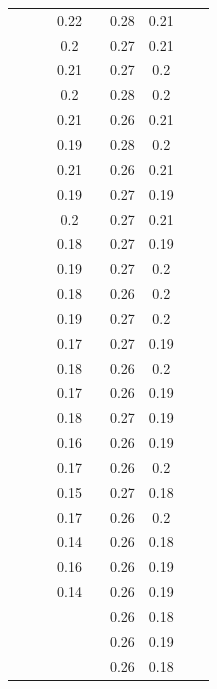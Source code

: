 \documentclass[AutoFakeBold]{LZUThesis}
\begin{document}
\begin{longtable}{ccccccccc}
      &       &       & 0.22  &       & 0.28  & 0.21 &      &       \\
      &       &       & 0.2   &       & 0.27  & 0.21 &      &       \\
      &       &       & 0.21  &       & 0.27  & 0.2  &      &       \\
      &       &       & 0.2   &       & 0.28  & 0.2  &      &       \\
      &       &       & 0.21  &       & 0.26  & 0.21 &      &       \\
      &       &       & 0.19  &       & 0.28  & 0.2  &      &       \\
      &       &       & 0.21  &       & 0.26  & 0.21 &      &       \\
      &       &       & 0.19  &       & 0.27  & 0.19 &      &       \\
      &       &       & 0.2   &       & 0.27  & 0.21 &      &       \\
      &       &       & 0.18  &       & 0.27  & 0.19 &      &       \\
      &       &       & 0.19  &       & 0.27  & 0.2  &      &       \\
      &       &       & 0.18  &       & 0.26  & 0.2  &      &       \\
      &       &       & 0.19  &       & 0.27  & 0.2  &      &       \\
      &       &       & 0.17  &       & 0.27  & 0.19 &      &       \\
      &       &       & 0.18  &       & 0.26  & 0.2  &      &       \\
      &       &       & 0.17  &       & 0.26  & 0.19 &      &       \\
      &       &       & 0.18  &       & 0.27  & 0.19 &      &       \\
      &       &       & 0.16  &       & 0.26  & 0.19 &      &       \\
      &       &       & 0.17  &       & 0.26  & 0.2  &      &       \\
      &       &       & 0.15  &       & 0.27  & 0.18 &      &       \\
      &       &       & 0.17  &       & 0.26  & 0.2  &      &       \\
      &       &       & 0.14  &       & 0.26  & 0.18 &      &       \\
      &       &       & 0.16  &       & 0.26  & 0.19 &      &       \\
      &       &       & 0.14  &       & 0.26  & 0.19 &      &       \\
      &       &       &       &       & 0.26  & 0.18 &      &       \\
      &       &       &       &       & 0.26  & 0.19 &      &       \\
      &       &       &       &       & 0.26  & 0.18 &      &       \\

    \bottomrule
\end{longtable}
\end{document}
